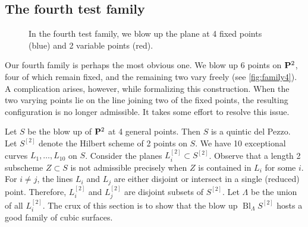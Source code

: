 \documentclass[reqno]{amsart}
\DeclareMathOperator{\Bl}{Bl}
\renewcommand {\P}{{\bf P}}
\numberwithin{equation}{section}
\begin{document}
\subsection{The fourth test family}
\label{sec:family-b_4}
\begin{figure}
    \centering


    \caption{In the fourth test family, we blow up the plane at 4 fixed points (blue) and 2 variable points (red).}
    \label{fig:family4}
  \end{figure}
Our fourth family is perhaps the most obvious one.
We blow up 6 points on $\P^2$, four of which remain fixed, and the remaining two vary freely (see \autoref{fig:family4}).
A complication arises, however, while formalizing this construction.
When the two varying points lie on the line joining two of the fixed points, the resulting configuration is no longer admissible.
It takes some effort to resolve this issue.

Let $S$ be the blow up of $\P^2$ at 4 general points.
Then $S$ is a quintic del Pezzo.
Let $S^{[2]}$ denote the Hilbert scheme of 2 points on $S$.
We have 10 exceptional curves $L_1, \dots, L_{10}$ on $S$.
Consider the planes $L^{[2]}_i \subset S^{[2]}$.
Observe that a length 2 subscheme $Z \subset S$ is not admissible precisely when $Z$ is contained in $L_i$ for some $i$.
For $i \neq j$, the lines $L_i$ and $L_j$ are either disjoint or intersect in a single (reduced) point.
Therefore, $L^{[2]}_i$ and  $L^{[2]}_j$ are disjoint subsets of $S^{[2]}$.
Let $\Lambda$ be the union of all $L^{[2]}_i$.
The crux of this
section is to show that the blow up $\Bl_{\Lambda}S^{[2]}$ hosts a
good family of cubic surfaces.
\end{document}
